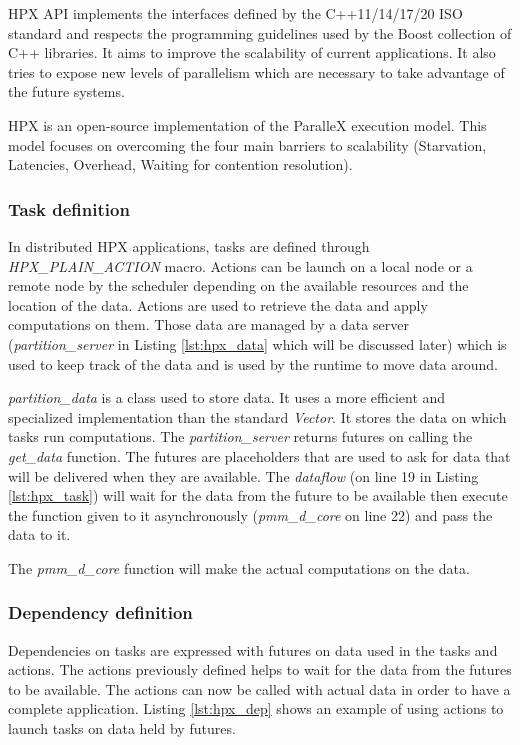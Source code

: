 HPX API implements the interfaces defined by the C++11/14/17/20 ISO standard and respects the programming guidelines used by the Boost collection of C++ libraries.
It aims to improve the scalability of current applications.
It also tries to expose new levels of parallelism which are necessary to take advantage of the future systems.

HPX is an open-source implementation of the ParalleX execution model.
This model focuses on overcoming the four main barriers to scalability (Starvation, Latencies, Overhead, Waiting for contention resolution).

\begin{figure}[h]

\end{figure}


\subsubsection{Task definition}
In distributed HPX applications, tasks are defined through \textit{HPX\_PLAIN\_ACTION} macro.
Actions can be launch on a local node or a remote node by the scheduler depending on the available resources and the location of the data.
Actions are used to retrieve the data and apply computations on them.
Those data are managed by a data server (\textit{partition\_server} in Listing \ref{lst:hpx_data} which will be discussed later) which is used to keep track of the data and is used by the runtime to move data around.

\textit{partition\_data} is a class used to store data.
It uses a more efficient and specialized implementation than the standard \textit{Vector}.
It stores the data on which tasks run computations.
The \textit{partition\_server} returns futures on calling the \textit{get\_data} function.
The futures are placeholders that are used to ask for data that will be delivered when they are available.
The \textit{dataflow} (on line 19 in Listing \ref{lst:hpx_task}) will wait for the data from the future to be available then execute the function given to it asynchronously (\textit{pmm\_d\_core} on line 22) and pass the data to it.

The \textit{pmm\_d\_core} function will make the actual computations on the data.

\subsubsection{Dependency definition}
Dependencies on tasks are expressed with futures on data used in the tasks and actions.
The actions previously defined helps to wait for the data from the futures to be available.
The actions can now be called with actual data in order to have a complete application.
Listing \ref{lst:hpx_dep} shows an example of using actions to launch tasks on data held by futures.

